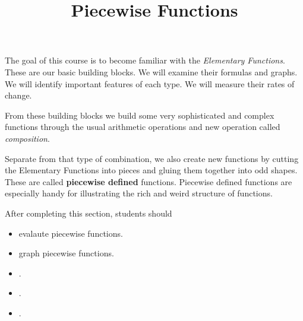 \documentclass{ximera}
\title{Piecewise Functions}
\begin{document}
\begin{abstract}
\end{abstract}
\maketitle



The goal of this course is to become familiar with the \textit{Elementary Functions}. These are our basic building blocks.  We will examine their formulas and graphs.  We will identify important features of each type. We will measure their rates of change. 

From these building blocks we build some very sophisticated and complex functions through the usual arithmetic operations and new operation called \textit{composition}. 

Separate from that type of combination, we also create new functions by cutting the Elementary Functions into pieces and gluing them together into odd shapes.   These are called \textbf{piecewise defined} functions.  Piecewise defined functions are especially handy for illustrating the rich and weird structure of functions.































\begin{sectionOutcomes}
After completing this section, students should 

\begin{itemize}
\item evalaute piecewise functions.
\item graph piecewise functions.
\item .
\item .
\item .
\end{itemize}
\end{sectionOutcomes}
\end{document}
